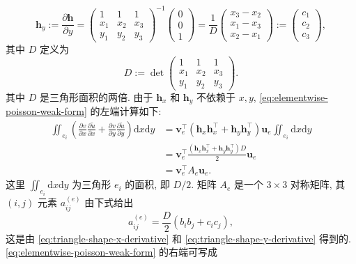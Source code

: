 \begin{equation}\label{eq:triangle-shape-y-derivative}
\boldsymbol{h}_y:=\frac{\partial\boldsymbol{h}}{\partial y}
=\begin{pmatrix}1&1&1\\x_1&x_2&x_3\\y_1&y_2&y_3\end{pmatrix}^{-1}\begin{pmatrix}0\\0\\1\end{pmatrix}
=\frac1D\begin{pmatrix}x_3-x_2\\x_1-x_3\\x_2-x_1\end{pmatrix}:=\begin{pmatrix}c_1\\c_2\\c_3\end{pmatrix},
\end{equation}
{其中 $D$ 定义为}
\[D:=\det\begin{pmatrix}1&1&1\\x_1&x_2&x_3\\y_1&y_2&y_3\end{pmatrix}.\]
{其中 $D$ 是三角形面积的两倍. 由于 $\boldsymbol{h}_x$ 和 $\boldsymbol{h}_y$ 不依赖于 $x,y$, \eqref{eq:elementwise-poisson-weak-form} 的左端计算如下:}
\[\begin{aligned}
\iint_{e_i}\left(\frac{\partial v}{\partial x}\frac{\partial\widetilde u}{\partial x}+\frac{\partial v}{\partial y}\frac{\partial\widetilde u}{\partial y}\right)\mathrm dx\mathrm dy
&=\boldsymbol{v}_e^{\top}(\boldsymbol{h}_x\boldsymbol{h}_x^{\top}+\boldsymbol{h}_y\boldsymbol{h}_y^{\top})\boldsymbol{u}_e\iint_{e_i}\mathrm dx\mathrm dy\\
&=\boldsymbol{v}_e^{\top}\frac{(\boldsymbol{h}_x\boldsymbol{h}_x^{\top}+\boldsymbol{h}_y\boldsymbol{h}_y^{\top})D}{2}\boldsymbol{u}_e\\
&=\boldsymbol{v}_e^{\top}A_e\boldsymbol{u}_e.
\end{aligned}\]
{这里 $\iint_{e_i}\mathrm dx\mathrm dy$ 为三角形 $e_i$ 的面积, 即 $D/2$. 矩阵 $A_e$ 是一个 $3\times3$ 对称矩阵, 其 $(i,j)$ 元素 $a_{ij}^{(e)}$ 由下式给出}
\begin{equation}\label{eq:element-stiffness-entry}
a_{ij}^{(e)}=\frac D2(b_ib_j+c_ic_j),
\end{equation}
{这是由 \eqref{eq:triangle-shape-x-derivative} 和 \eqref{eq:triangle-shape-y-derivative} 得到的. \eqref{eq:elementwise-poisson-weak-form} 的右端可写成}
